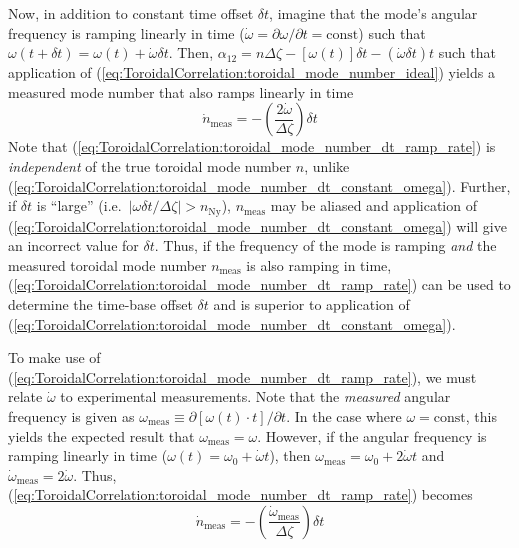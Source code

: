 Now, in addition to constant time offset $\delta t$,
imagine that the mode's angular frequency is ramping linearly in time
($\dot{\omega} = \partial \omega / \partial t = \text{const}$) such that
$\omega(t + \delta t) = \omega(t) + \dot{\omega} \delta t$.
Then,
$\alpha_{12}
=
n \Delta \zeta - [\omega(t)] \delta t - (\dot{\omega} \delta t) t$
such that application of
(\ref{eq:ToroidalCorrelation:toroidal_mode_number_ideal})
yields a measured mode number that also ramps linearly in time
\begin{equation}
  \dot{n}_{\text{meas}}
  =
  - \left( \frac{2 \dot{\omega}}{\Delta \zeta} \right) \delta t
  \label{eq:ToroidalCorrelation:toroidal_mode_number_dt_ramp_rate}
\end{equation}
Note that (\ref{eq:ToroidalCorrelation:toroidal_mode_number_dt_ramp_rate}) is
\emph{independent} of the true toroidal mode number $n$,
unlike (\ref{eq:ToroidalCorrelation:toroidal_mode_number_dt_constant_omega}).
Further, if $\delta t$ is ``large''
(i.e.\ $|\omega \delta t / \Delta \zeta| > n_{\text{Ny}}$),
$n_{\text{meas}}$ may be aliased and application of
(\ref{eq:ToroidalCorrelation:toroidal_mode_number_dt_constant_omega})
will give an incorrect value for $\delta t$.
Thus, if the frequency of the mode is ramping \emph{and}
the measured toroidal mode number $n_{\text{meas}}$ is also ramping in time,
(\ref{eq:ToroidalCorrelation:toroidal_mode_number_dt_ramp_rate})
can be used to determine the time-base offset $\delta t$ and
is superior to application of
(\ref{eq:ToroidalCorrelation:toroidal_mode_number_dt_constant_omega}).

To make use of (\ref{eq:ToroidalCorrelation:toroidal_mode_number_dt_ramp_rate}),
we must relate $\dot{\omega}$ to experimental measurements.
Note that the \emph{measured} angular frequency is given as
$\omega_{\text{meas}} \equiv \partial[\omega(t) \cdot t] / \partial t$.
In the case where $\omega = \text{const}$,
this yields the expected result that $\omega_{\text{meas}} = \omega$.
However, if the angular frequency is ramping linearly in time
($\omega(t) = \omega_0 + \dot{\omega} t$), then
$\omega_{\text{meas}} = \omega_0 + 2 \dot{\omega} t$ and
$\dot{\omega}_{\text{meas}} = 2 \dot{\omega}$.
Thus, (\ref{eq:ToroidalCorrelation:toroidal_mode_number_dt_ramp_rate}) becomes
\begin{equation}
  \dot{n}_{\text{meas}}
  =
  - \left( \frac{\dot{\omega}_{\text{meas}}}{\Delta \zeta} \right) \delta t
  \label{eq:ToroidalCorrelation:toroidal_mode_number_dt_ramp_rate_lab_frame}
\end{equation}


